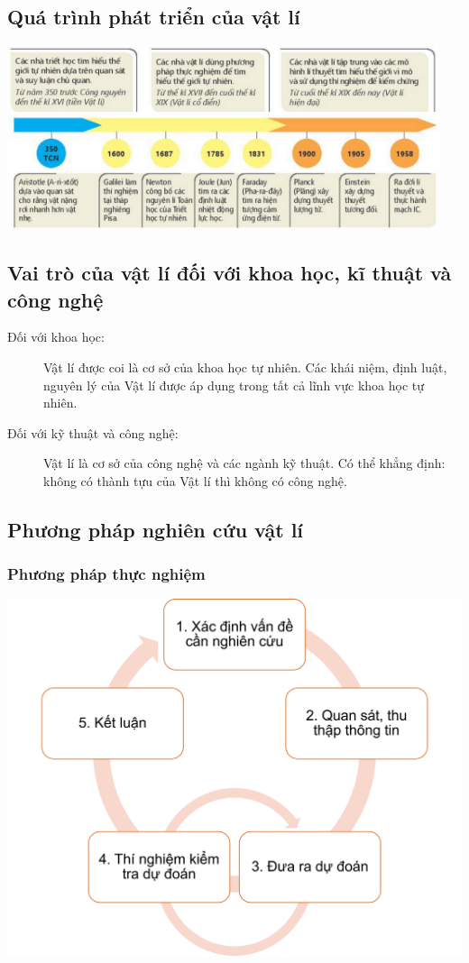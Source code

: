 \subsection{Quá trình phát triển của vật lí}
\begin{center}
	\includegraphics[width=0.95\textwidth]{../figs/G10-1-1}
\end{center}

\subsection{Vai trò của vật lí đối với khoa học, kĩ thuật và công nghệ}
	\begin{description}
		\item[Đối với khoa học:] Vật lí được coi là cơ sở của khoa học tự nhiên. Các khái niệm, định luật, nguyên lý của Vật lí được áp dụng trong tất cả lĩnh vực khoa học tự nhiên. 
		\item[Đối với kỹ thuật và công nghệ:] Vật lí là cơ sở của công nghệ và các ngành kỹ thuật. Có thể khẳng định: không có thành tựu của Vật lí thì không có công nghệ.  
	\end{description}
\subsection{Phương pháp nghiên cứu vật lí}
\subsubsection{Phương pháp thực nghiệm}
\begin{center}
	\includegraphics[scale=0.4]{../figs/G10-1-2}
\end{center}

